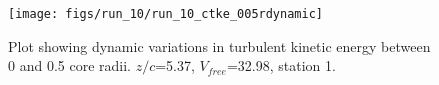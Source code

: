 \begin{figure}[H]
\centering
\texttt{[image: figs/run\_10/run\_10\_ctke\_005rdynamic]}
\caption{Plot showing dynamic variations in turbulent kinetic energy between 0 and 0.5 core radii. $z/c$=5.37, $V_{free}$=32.98, station 1.}
\label{fig:run_10_ctke_005rdynamic}
\end{figure}


